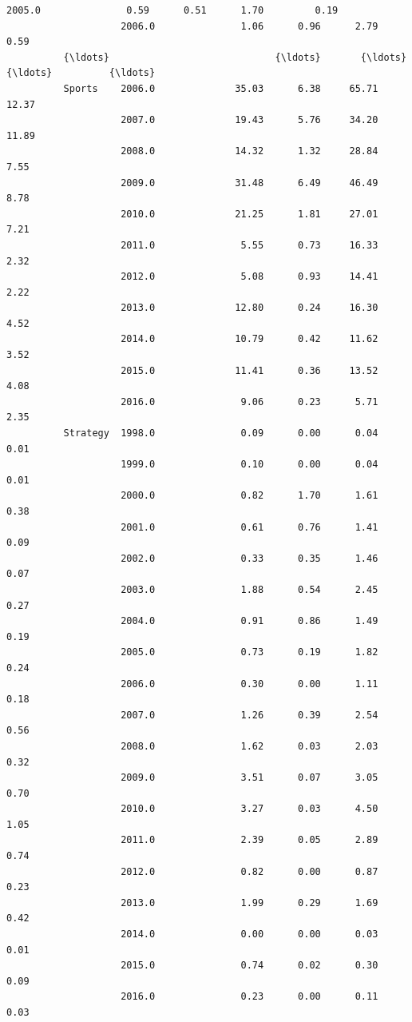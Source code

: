 \documentclass[11pt]{article}
\begin{document}
\begin{Verbatim}[commandchars=\\\{\}]
                    2005.0               0.59      0.51      1.70         0.19   
                    2006.0               1.06      0.96      2.79         0.59   
          {\ldots}                             {\ldots}       {\ldots}       {\ldots}          {\ldots}   
          Sports    2006.0              35.03      6.38     65.71        12.37   
                    2007.0              19.43      5.76     34.20        11.89   
                    2008.0              14.32      1.32     28.84         7.55   
                    2009.0              31.48      6.49     46.49         8.78   
                    2010.0              21.25      1.81     27.01         7.21   
                    2011.0               5.55      0.73     16.33         2.32   
                    2012.0               5.08      0.93     14.41         2.22   
                    2013.0              12.80      0.24     16.30         4.52   
                    2014.0              10.79      0.42     11.62         3.52   
                    2015.0              11.41      0.36     13.52         4.08   
                    2016.0               9.06      0.23      5.71         2.35   
          Strategy  1998.0               0.09      0.00      0.04         0.01   
                    1999.0               0.10      0.00      0.04         0.01   
                    2000.0               0.82      1.70      1.61         0.38   
                    2001.0               0.61      0.76      1.41         0.09   
                    2002.0               0.33      0.35      1.46         0.07   
                    2003.0               1.88      0.54      2.45         0.27   
                    2004.0               0.91      0.86      1.49         0.19   
                    2005.0               0.73      0.19      1.82         0.24   
                    2006.0               0.30      0.00      1.11         0.18   
                    2007.0               1.26      0.39      2.54         0.56   
                    2008.0               1.62      0.03      2.03         0.32   
                    2009.0               3.51      0.07      3.05         0.70   
                    2010.0               3.27      0.03      4.50         1.05   
                    2011.0               2.39      0.05      2.89         0.74   
                    2012.0               0.82      0.00      0.87         0.23   
                    2013.0               1.99      0.29      1.69         0.42   
                    2014.0               0.00      0.00      0.03         0.01   
                    2015.0               0.74      0.02      0.30         0.09   
                    2016.0               0.23      0.00      0.11         0.03   
          

\end{Verbatim}
\end{document}
